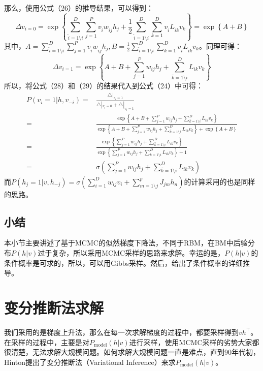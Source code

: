 \documentclass[a4paper]{article}
\begin{document}
那么，使用公式（26）的推导结果，可以得到：
\begin{equation}
    \Delta v_{i = 0} = \exp \left\{\sum_{\hat{i}=1\setminus i}^{D} \sum_{j=1}^{P} v_{\hat{i}} w_{\hat{i} j} h_{j}+ \frac{1}{2}\sum_{\hat{i}=1\setminus i}^{D} \sum_{k=1}^{D} v_{\hat{i}} L_{\hat{i} k} v_{k} \right\} = \exp \left\{ A+B \right\}
\end{equation}
其中，$A = \sum_{\hat{i}=1\setminus i}^{D} \sum_{j=1}^{P} v_{\hat{i}} w_{\hat{i} j} h_{j}, B = \frac{1}{2}\sum_{\hat{i}=1\setminus i}^{D} \sum_{k=1}^{D} v_{\hat{i}} L_{\hat{i} k} v_{k}$。同理可得：
\begin{equation}
    \Delta v_{i = 1} = \exp \left\{A + B +\sum_{j=1}^{P} w_{i j} h_{j} + \sum_{\hat{k}=1\setminus i}^{D} L_{i k} v_{k} \right\}
\end{equation}
所以，将公式（28）和（29）的结果代入到公式（24）中可得：
\begin{equation}
\begin{split}
     P\left(v_{i}=1 | h, v_{-i}\right) = & \frac{\triangle|_{v_i = 1}}{\triangle|_{v_i = 0} + \triangle|_{v_i = 1}} \\
     = & \frac{\exp \left\{A + B +\sum_{j=1}^{P} w_{i j} h_{j} + \sum_{\hat{k}=1\setminus i}^{D} L_{i k} v_{k} \right\}}{\exp \left\{A + B +\sum_{j=1}^{P} w_{i j} h_{j} + \sum_{\hat{k}=1\setminus i}^{D} L_{i k} v_{k} \right\} + \exp \left\{ A+B \right\}} \\
     = & \frac{\exp \left\{\sum_{j=1}^{P} w_{i j} h_{j} + \sum_{\hat{k}=1\setminus i}^{D} L_{i k} v_{k} \right\}}{\exp \left\{\sum_{j=1}^{P} w_{i j} h_{j} + \sum_{\hat{k}=1\setminus i}^{D} L_{i k} v_{k} \right\} + 1} \\
     = & \sigma \left( \sum_{j=1}^{P} w_{i j} h_{j} + \sum_{\hat{k}=1\setminus i}^{D} L_{i k} v_{k}  \right)
\end{split}
\end{equation}
而$P\left(h_{j}=1 | v, h_{-j}\right)=\sigma\left(\sum_{i=1}^{D} w_{i j} v_{i}+\sum_{m=1\setminus j}^{p} J_{j m} h_{n}\right)$的计算采用的也是同样的思路。
\subsection{小结}
本小节主要讲述了基于MCMC的似然梯度下降法，不同于RBM，在BM中后验分布$P(h|v)$过于复杂，所以采用MCMC采样的思路来求解。幸运的是，$P(h|v)$的条件概率是可求的，所以，可以用Gibbs采样。然后，给出了条件概率的详细推导。

\section{变分推断法求解}
我们采用的是梯度上升法，那么在每一次求解梯度的过程中，都要采样得到$vh^{\top}$。在采样的过程中，主要是对$P_{\text{model}}(h|v)$进行采样，使用MCMC采样的劣势大家都很清楚，无法求解大规模问题。如何求解大规模问题一直是难点，直到90年代初，Hinton提出了变分推断法（Variational Inference）来求$P_{\text{model}}(h|v)$。
\end{document}
